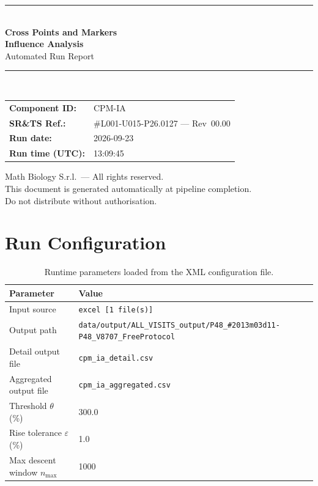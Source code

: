 \documentclass[a4paper,11pt]{article}
\begin{document}
\begin{titlepage}
\begin{center}
  \vspace*{1.8cm}
  {\color{dmaaccent}\rule{\linewidth}{1.5pt}}\\[0.6cm]
  {\LARGE\bfseries\color{dmaaccent}
    Cross Points and Markers\\[0.25cm]
    Influence Analysis}\\[0.4cm]
  {\Large Automated Run Report}\\[0.3cm]
  {\color{dmaaccent}\rule{\linewidth}{1.5pt}}\\[2cm]

  \begin{tabular}{ll}
    \textbf{Component ID:}   & CPM-IA \\[0.3cm]
    \textbf{SR\&TS Ref.:}    & \#L001-U015-P26.0127 --- Rev~00.00 \\[0.3cm]
    \textbf{Run date:}       & 2026-09-23 \\[0.3cm]
    \textbf{Run time (UTC):} & 13:09:45 \\
  \end{tabular}

  \vfill
  {\color{dmagray}\small
    Math Biology S.r.l.\ --- All rights reserved.\\
    This document is generated automatically at pipeline completion.\\
    Do not distribute without authorisation.}
\end{center}
\end{titlepage}

\tableofcontents
\clearpage

\section{Run Configuration}

\begin{table}[h!]
\centering
\small
\caption{Runtime parameters loaded from the XML configuration file.}
\begin{tabular}{ll}
\toprule
\textbf{Parameter} & \textbf{Value} \\
\midrule
Input source                      & \texttt{excel [1 file(s)]} \\
Output path                       & \texttt{data/output/ALL\_VISITS\_output/P48\_\#2013m03d11-P48\_V8707\_FreeProtocol} \\
Detail output file                & \texttt{cpm\_ia\_detail.csv} \\
Aggregated output file            & \texttt{cpm\_ia\_aggregated.csv} \\
Threshold $\theta$ (\%)           & 300.0 \\
Rise tolerance $\varepsilon$ (\%) & 1.0 \\
Max descent window $n_{\max}$     & 1000 \\
\bottomrule
\end{tabular}
\end{table}
\end{document}
